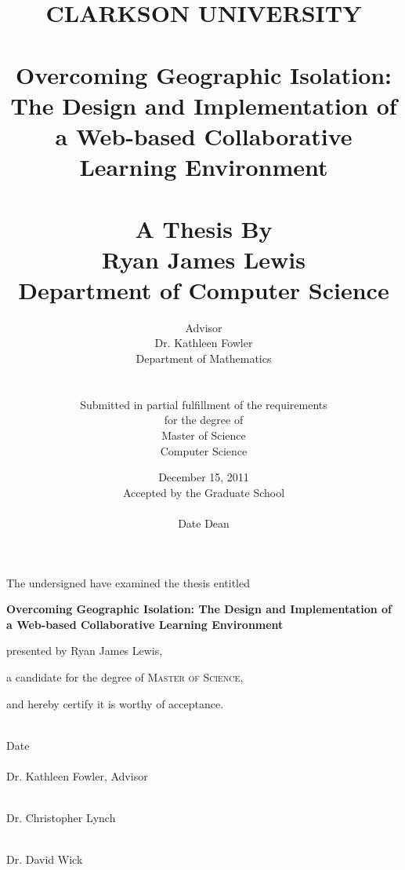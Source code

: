 \documentclass[letterpaper,12pt]{report}
\title{CLARKSON UNIVERSITY \\
\ \\
Overcoming Geographic Isolation: The Design and Implementation of a Web-based Collaborative Learning Environment \\ 
\ \\
\large{A Thesis By \\
\textbf{Ryan James Lewis} \\
Department of Computer Science \\
}}
\author{Advisor \\
Dr. 	Kathleen Fowler \\
Department of Mathematics \\
\ \\ \\
Submitted in partial fulfillment of the requirements \\
for the degree of \\
Master of Science \\
Computer Science}
\date{December 15, 2011 \\
\vspace{.1in}
Accepted by the Graduate School \\
\vspace{.4in}
\hrulefill \\
Date \hspace{2in} Dean
}
\begin{document}
\maketitle

\thispagestyle{empty}
\begin{center}
The undersigned have examined the thesis entitled

\vspace{0.4in}

\textbf{Overcoming Geographic Isolation: The Design and Implementation of a Web-based Collaborative Learning Environment}

\vspace{0.4in}

presented by Ryan James Lewis,

\vspace{0.4in}

a candidate for the degree of \textsc{Master of Science},

\vspace{0.4in}

and hereby certify it is worthy of acceptance.

\vspace{0.5in}
\hrulefill \\

Date \\
\vspace{0.5in}
\hrulefill \\
\hfill Dr. Kathleen Fowler, Advisor

\vspace{0.5in}
\hrulefill \\
\hfill Dr. Christopher Lynch

\vspace{0.5in}
\hrulefill \\
\hfill Dr. David Wick
\end{center}
\end{document}
